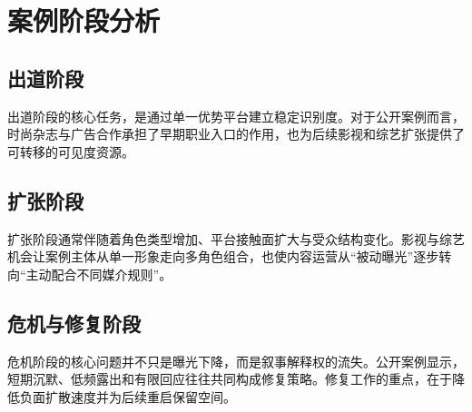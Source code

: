 \chapter{案例阶段分析}

\section{出道阶段}

出道阶段的核心任务，是通过单一优势平台建立稳定识别度。对于公开案例而言，时尚杂志与广告合作承担了早期职业入口的作用，也为后续影视和综艺扩张提供了可转移的可见度资源。

\section{扩张阶段}

扩张阶段通常伴随着角色类型增加、平台接触面扩大与受众结构变化。影视与综艺机会让案例主体从单一形象走向多角色组合，也使内容运营从“被动曝光”逐步转向“主动配合不同媒介规则”。

\section{危机与修复阶段}

危机阶段的核心问题并不只是曝光下降，而是叙事解释权的流失。公开案例显示，短期沉默、低频露出和有限回应往往共同构成修复策略。修复工作的重点，在于降低负面扩散速度并为后续重启保留空间。
